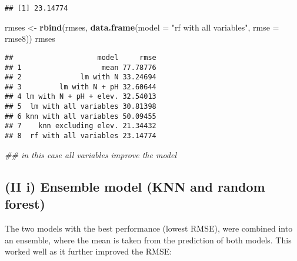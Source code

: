 \documentclass[
]{article}
\newenvironment{Shaded}{\begin{snugshade}}{\end{snugshade}}
\newcommand{\CommentTok}[1]{\textcolor[rgb]{0.56,0.35,0.01}{\textit{#1}}}
\newcommand{\DataTypeTok}[1]{\textcolor[rgb]{0.13,0.29,0.53}{#1}}
\newcommand{\DecValTok}[1]{\textcolor[rgb]{0.00,0.00,0.81}{#1}}
\newcommand{\KeywordTok}[1]{\textcolor[rgb]{0.13,0.29,0.53}{\textbf{#1}}}
\newcommand{\NormalTok}[1]{#1}
\newcommand{\OperatorTok}[1]{\textcolor[rgb]{0.81,0.36,0.00}{\textbf{#1}}}
\newcommand{\StringTok}[1]{\textcolor[rgb]{0.31,0.60,0.02}{#1}}
\begin{document}
\begin{Shaded}
\end{Shaded}

\begin{verbatim}
## [1] 23.14774
\end{verbatim}

\begin{Shaded}
\begin{Highlighting}[]
\NormalTok{rmses <{-}}\StringTok{ }\KeywordTok{rbind}\NormalTok{(rmses, }
               \KeywordTok{data.frame}\NormalTok{(}\DataTypeTok{model =} \StringTok{"rf with all variables"}\NormalTok{, }\DataTypeTok{rmse =}\NormalTok{ rmse8))}
\NormalTok{rmses}
\end{Highlighting}
\end{Shaded}

\begin{verbatim}
##                    model     rmse
## 1                   mean 77.78776
## 2              lm with N 33.24694
## 3         lm with N + pH 32.60644
## 4 lm with N + pH + elev. 32.54013
## 5  lm with all variables 30.81398
## 6 knn with all variables 50.09455
## 7    knn excluding elev. 21.34432
## 8  rf with all variables 23.14774
\end{verbatim}

\begin{Shaded}
\begin{Highlighting}[]
\CommentTok{\#\# in this case all variables improve the model}
\end{Highlighting}
\end{Shaded}

\hypertarget{ii-i-ensemble-model-knn-and-random-forest}{%
\subsection{(II i) Ensemble model (KNN and random
forest)}\label{ii-i-ensemble-model-knn-and-random-forest}}

The two models with the best performance (lowest RMSE), were combined
into an ensemble, where the mean is taken from the prediction of both
models. This worked well as it further improved the RMSE:

\begin{Shaded}
\end{Shaded}
\end{document}
